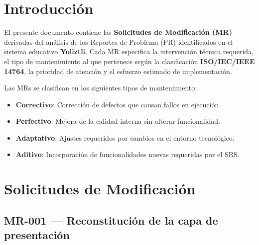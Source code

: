 \documentclass[12pt]{article}
\begin{document}
\newpage
{\hypersetup{linkcolor=black}\tableofcontents}
\newpage

\section{Introducción}

El presente documento contiene las \textbf{Solicitudes de Modificación (MR)} derivadas
del análisis de los Reportes de Problema (PR) identificados en el sistema educativo
\textbf{Yoliztli}. Cada MR especifica la intervención técnica requerida, el tipo de
mantenimiento al que pertenece según la clasificación \textbf{ISO/IEC/IEEE 14764},
la prioridad de atención y el esfuerzo estimado de implementación.

Las MRs se clasifican en los siguientes tipos de mantenimiento:

\begin{itemize}
    \item \textbf{Correctivo}: Corrección de defectos que causan fallos en ejecución.
    \item \textbf{Perfectivo}: Mejora de la calidad interna sin alterar funcionalidad.
    \item \textbf{Adaptativo}: Ajustes requeridos por cambios en el entorno tecnológico.
    \item \textbf{Aditivo}: Incorporación de funcionalidades nuevas requeridas por el SRS.
\end{itemize}

\section{Solicitudes de Modificación}

\subsection[MR-001: Reconstitución de la capa de presentación]{MR-001 --- Reconstitución de la capa de presentación}
\end{document}
